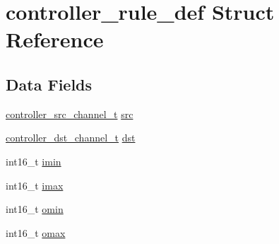 \hypertarget{structcontroller__rule__def}{\section{controller\+\_\+rule\+\_\+def Struct Reference}
\label{structcontroller__rule__def}
}
\subsection*{Data Fields}
\begin{DoxyCompactItemize}
\item 
\hyperlink{controller_8c_a0812088f658e220bb7a17c20f1f99649}{controller\+\_\+src\+\_\+channel\+\_\+t} \hyperlink{structcontroller__rule__def_a3f15a42724fce9ddcb35e350b74358ab}{src}
\item 
\hyperlink{controller_8c_a0b333f7b87c6ff48fceb1b0e2d2f857d}{controller\+\_\+dst\+\_\+channel\+\_\+t} \hyperlink{structcontroller__rule__def_a1f51a0b551a0c2770b6a86afd65efa27}{dst}
\item 
int16\+\_\+t \hyperlink{structcontroller__rule__def_ae9e7e3cd96e749f52bccc427157129e1}{imin}
\item 
int16\+\_\+t \hyperlink{structcontroller__rule__def_a8f61d9203d32dd449924410dd9e14d5f}{imax}
\item 
int16\+\_\+t \hyperlink{structcontroller__rule__def_ac1499475a35a46b04a1510f57206134f}{omin}
\item 
int16\+\_\+t \hyperlink{structcontroller__rule__def_a5f3bb2bccfa7fdaf94fac0ad96b367b6}{omax}
\end{DoxyCompactItemize}


